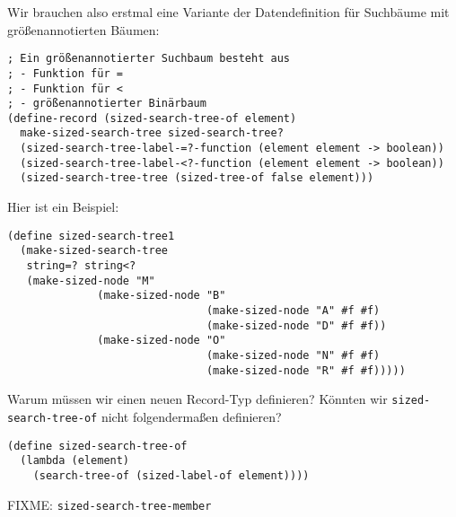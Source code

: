 Wir brauchen also erstmal eine Variante der Datendefinition für
Suchbäume mit größenannotierten Bäumen:
%
\begin{lstlisting}
; Ein größenannotierter Suchbaum besteht aus
; - Funktion für =
; - Funktion für <
; - größenannotierter Binärbaum
(define-record (sized-search-tree-of element)
  make-sized-search-tree sized-search-tree?
  (sized-search-tree-label-=?-function (element element -> boolean))
  (sized-search-tree-label-<?-function (element element -> boolean))
  (sized-search-tree-tree (sized-tree-of false element)))
\end{lstlisting}
%
Hier ist ein Beispiel:
%
\begin{lstlisting}
(define sized-search-tree1
  (make-sized-search-tree
   string=? string<?
   (make-sized-node "M"
              (make-sized-node "B"
                               (make-sized-node "A" #f #f)
                               (make-sized-node "D" #f #f))
              (make-sized-node "O"
                               (make-sized-node "N" #f #f)
                               (make-sized-node "R" #f #f)))))
\end{lstlisting}
% 
\begin{aufgabeinline}
  Warum müssen wir einen neuen Record-Typ definieren?  Könnten wir
  \lstinline{sized-search-tree-of} nicht folgendermaßen definieren?
\begin{lstlisting}
(define sized-search-tree-of
  (lambda (element)
    (search-tree-of (sized-label-of element))))
\end{lstlisting}
\end{aufgabeinline}
%
FIXME: \lstinline{sized-search-tree-member}

